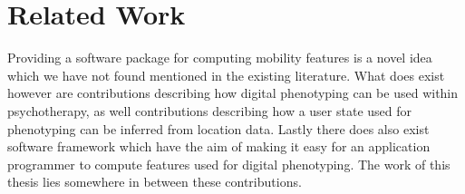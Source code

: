 \chapter{Related Work}
\label{chapter:02}
Providing a software package for computing mobility features is a novel idea which we have not found mentioned in the existing literature. What does exist however are contributions describing how digital phenotyping can be used within psychotherapy, as well contributions describing how a user state used for phenotyping can be inferred from location data. Lastly there does also exist software framework which have the aim of making it easy for an application programmer to compute features used for digital phenotyping. The work of this thesis lies somewhere in between these contributions.





